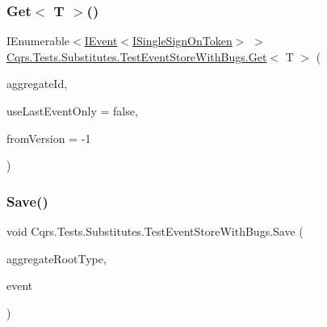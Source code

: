 \subsubsection{\texorpdfstring{Get$<$ T $>$()}{Get< T >()}}
{\footnotesize\ttfamily I\+Enumerable$<$\hyperlink{interfaceCqrs_1_1Events_1_1IEvent}{I\+Event}$<$\hyperlink{interfaceCqrs_1_1Authentication_1_1ISingleSignOnToken}{I\+Single\+Sign\+On\+Token}$>$ $>$ \hyperlink{classCqrs_1_1Tests_1_1Substitutes_1_1TestEventStoreWithBugs_af0ff73d3f8e8b28574ecef798d0be503_af0ff73d3f8e8b28574ecef798d0be503}{Cqrs.\+Tests.\+Substitutes.\+Test\+Event\+Store\+With\+Bugs.\+Get}$<$ T $>$ (\begin{DoxyParamCaption}\item[{Guid}]{aggregate\+Id,  }\item[{bool}]{use\+Last\+Event\+Only = {\ttfamily false},  }\item[{int}]{from\+Version = {\ttfamily -\/1} }\end{DoxyParamCaption})}

\mbox{\label{classCqrs_1_1Tests_1_1Substitutes_1_1TestEventStoreWithBugs_ae2208808270f6f4b20856f04b5693f2c_ae2208808270f6f4b20856f04b5693f2c}} 
\subsubsection{\texorpdfstring{Save()}{Save()}}
{\footnotesize\ttfamily void Cqrs.\+Tests.\+Substitutes.\+Test\+Event\+Store\+With\+Bugs.\+Save (\begin{DoxyParamCaption}\item[{Type}]{aggregate\+Root\+Type,  }\item[{\hyperlink{interfaceCqrs_1_1Events_1_1IEvent}{I\+Event}$<$ \hyperlink{interfaceCqrs_1_1Authentication_1_1ISingleSignOnToken}{I\+Single\+Sign\+On\+Token} $>$ @}]{event }\end{DoxyParamCaption})}

\mbox{\label{classCqrs_1_1Tests_1_1Substitutes_1_1TestEventStoreWithBugs_a22ce91768f915a6f01894137dd314c42_a22ce91768f915a6f01894137dd314c42}} 
